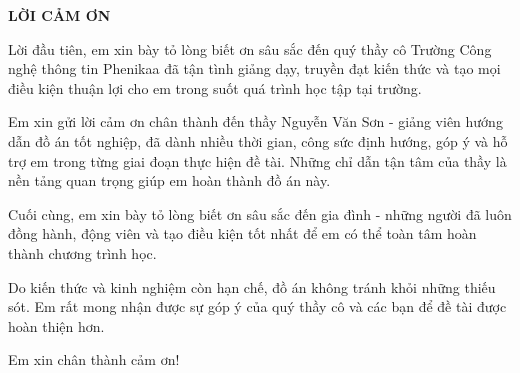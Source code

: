 \begin{center}
    {\large\bfseries LỜI CẢM ƠN}
\end{center}

\vspace{0.5cm}

\indent Lời đầu tiên, em xin bày tỏ lòng biết ơn sâu sắc đến quý thầy cô Trường Công nghệ thông tin Phenikaa đã tận tình giảng dạy, truyền đạt kiến thức và tạo mọi điều kiện thuận lợi
cho em trong suốt quá trình học tập tại trường.

\indent Em xin gửi lời cảm ơn chân thành đến thầy Nguyễn Văn Sơn - giảng viên
hướng dẫn đồ án tốt nghiệp, đã dành nhiều thời gian, công sức định hướng, góp ý và
hỗ trợ em trong từng giai đoạn thực hiện đề tài. Những chỉ dẫn tận tâm của thầy là
nền tảng quan trọng giúp em hoàn thành đồ án này.

\indent Cuối cùng, em xin bày tỏ lòng biết ơn sâu sắc đến gia đình - những người
đã luôn đồng hành, động viên và tạo điều kiện tốt nhất để em có thể toàn tâm hoàn
thành chương trình học.

\indent Do kiến thức và kinh nghiệm còn hạn chế, đồ án không tránh khỏi những thiếu
sót. Em rất mong nhận được sự góp ý của quý thầy cô và các bạn để đề tài được hoàn
thiện hơn.

\indent Em xin chân thành cảm ơn!